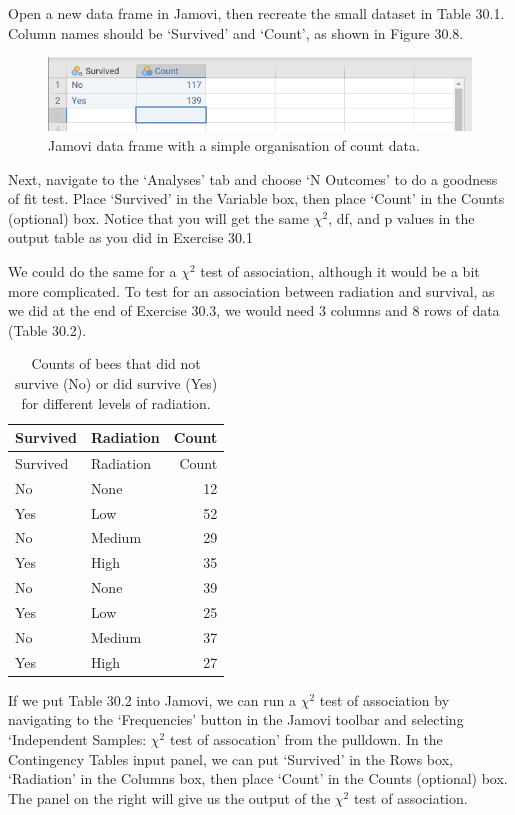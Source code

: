 \documentclass[
]{scrbook}
\begin{document}
Open a new data frame in Jamovi, then recreate the small dataset in Table 30.1.
Column names should be `Survived' and `Count', as shown in Figure 30.8.

\begin{figure}
\includegraphics[width=1\linewidth]{img/jamovi_simple_counts} \caption{Jamovi data frame with a simple organisation of count data.}\label{fig:unnamed-chunk-158}
\end{figure}

Next, navigate to the `Analyses' tab and choose `N Outcomes' to do a goodness of fit test.
Place `Survived' in the Variable box, then place `Count' in the Counts (optional) box.
Notice that you will get the same \(\chi^{2}\), df, and p values in the output table as you did in Exercise 30.1

We could do the same for a \(\chi^{2}\) test of association, although it would be a bit more complicated.
To test for an association between radiation and survival, as we did at the end of Exercise 30.3, we would need 3 columns and 8 rows of data (Table 30.2).

\begin{longtable}[]{@{}llr@{}}
\caption{\label{tab:unnamed-chunk-159}Counts of bees that did not survive (No) or did survive (Yes) for different levels of radiation.}\tabularnewline
\toprule
Survived & Radiation & Count \\
\midrule
\endfirsthead
\toprule
Survived & Radiation & Count \\
\midrule
\endhead
No & None & 12 \\
Yes & Low & 52 \\
No & Medium & 29 \\
Yes & High & 35 \\
No & None & 39 \\
Yes & Low & 25 \\
No & Medium & 37 \\
Yes & High & 27 \\
\bottomrule
\end{longtable}

If we put Table 30.2 into Jamovi, we can run a \(\chi^{2}\) test of association by navigating to the `Frequencies' button in the Jamovi toolbar and selecting `Independent Samples: \(\chi^{2}\) test of assocation' from the pulldown.
In the Contingency Tables input panel, we can put `Survived' in the Rows box, `Radiation' in the Columns box, then place `Count' in the Counts (optional) box.
The panel on the right will give us the output of the \(\chi^{2}\) test of association.
\end{document}
